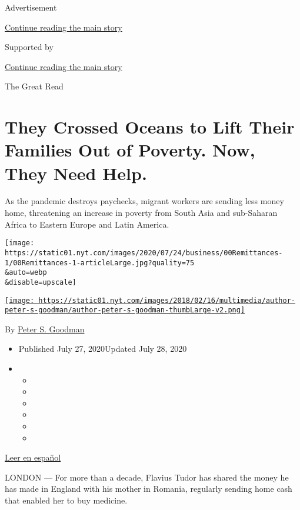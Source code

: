 Advertisement

\protect\hyperlink{after-top}{Continue reading the main story}

Supported by

\protect\hyperlink{after-sponsor}{Continue reading the main story}

The Great Read

\hypertarget{they-crossed-oceans-to-lift-their-families-out-of-poverty-now-they-need-help}{%
\section{They Crossed Oceans to Lift Their Families Out of Poverty. Now,
They Need
Help.}\label{they-crossed-oceans-to-lift-their-families-out-of-poverty-now-they-need-help}}

As the pandemic destroys paychecks, migrant workers are sending less
money home, threatening an increase in poverty from South Asia and
sub-Saharan Africa to Eastern Europe and Latin America.

\texttt{[image: https://static01.nyt.com/images/2020/07/24/business/00Remittances-1/00Remittances-1-articleLarge.jpg?quality=75\\\&auto=webp\\\&disable=upscale]}

\href{https://www.nytimes.com/by/peter-s-goodman}{\texttt{[image: https://static01.nyt.com/images/2018/02/16/multimedia/author-peter-s-goodman/author-peter-s-goodman-thumbLarge-v2.png]}}

By \href{https://www.nytimes.com/by/peter-s-goodman}{Peter S. Goodman}

\begin{itemize}
\item
  Published July 27, 2020Updated July 28, 2020
\item
  \begin{itemize}
  \item
  \item
  \item
  \item
  \item
  \item
  \end{itemize}
\end{itemize}

\href{https://www.nytimes.com/es/2020/07/28/espanol/mundo/remesas-coronavirus.html}{Leer
en español}

LONDON --- For more than a decade, Flavius Tudor has shared the money he
has made in England with his mother in Romania, regularly sending home
cash that enabled her to buy medicine.

